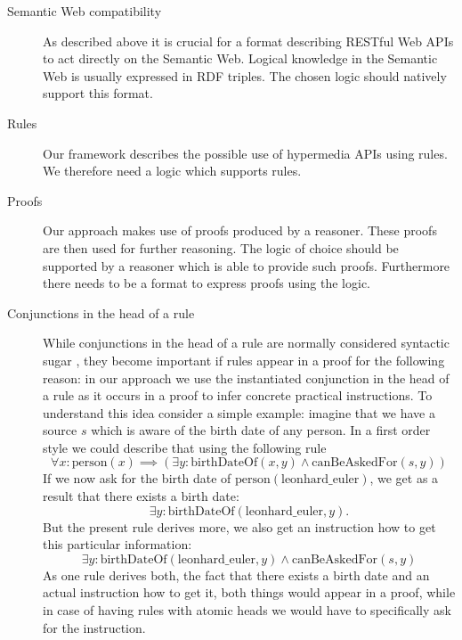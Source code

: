\begin{description}
 \item[Semantic Web compatibility] As described above it is crucial for a format describing RESTful Web APIs to act directly on the Semantic Web. Logical knowledge
 in the Semantic Web is usually expressed in RDF triples. The chosen logic should natively support this format. 
 \item[Rules] Our framework describes the possible use of hypermedia APIs using rules. We therefore need a logic which supports rules.
 \item[Proofs] Our approach makes use of proofs produced by a reasoner. These proofs are then used for further reasoning. The logic of choice should 
 be supported by a reasoner which is able to provide such proofs. Furthermore there needs to be a format to express proofs using the logic.
 \item[Conjunctions in the head of a rule] While conjunctions in the head of a rule are normally considered syntactic sugar \cite{sugar}, they become important if 
 rules appear in a proof for the following reason:
 in our approach we use the instantiated conjunction in the head of a rule as it occurs in a proof to infer concrete practical instructions. 
 To understand this idea consider a simple example: imagine that we have a source $s$ which is aware of 
 the birth date of any person. In a first order style
 we could describe that using the following rule
 \[
 \forall x:  \text{person}(x)\implies (\exists y: \text{birthDateOf}(x, y) \wedge \text{canBeAskedFor}(s,y))
 \]
If we now ask for the birth date of $\text{person}(\text{leonhard\_euler})$,
we get as a result that there exists a birth date: \[\exists y: \text{birthDateOf}(\text{leonhard\_euler}, y).\] 
But the present rule derives more, we also get an instruction how to get this particular information: %
\[
 \exists y: \text{birthDateOf}(\text{leonhard\_euler}, y) \wedge \text{canBeAskedFor}(s,y)
\]
As one rule derives both, the fact that there exists a birth date and an actual instruction how to get it, both things would appear in a proof, while
in case of having rules with atomic heads we would have to specifically ask for the instruction.

\end{description}
